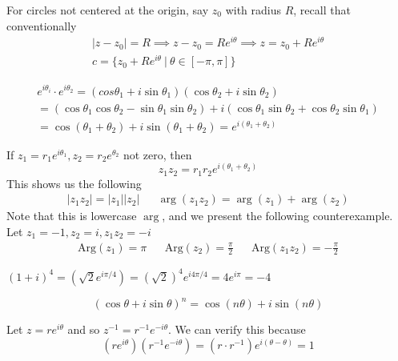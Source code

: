 \documentclass[12pt]{scrartcl}
\begin{document}
\begin{note}
  For circles not centered at the origin, say $z_0$ with radius $R$, recall that conventionally
  \begin{align*}
    |z-z_0| = R \implies z-z_0 = Re^{i\theta} \implies z = z_0 + Re^{i\theta}\\ 
    c = \{z_0 + Re^{i\theta} \ | \ \theta \in [-\pi, \pi]\}
  \end{align*}
\end{note}

\begin{note}
  \begin{align*}
    e^{i\theta_i} \cdot e^{i\theta_2} = (cos\theta_1 + i\sin\theta_1)(\cos\theta_2 + i\sin\theta_2)\\
    = (\cos\theta_1 \cos\theta_2 - \sin\theta_1 \sin\theta_2) + i(\cos\theta_1 \sin\theta_2 + \cos\theta_2\sin\theta_1)\\
     = \cos(\theta_1 + \theta_2) + i\sin(\theta_1 + \theta_2) = e^{i(\theta_1 + \theta_2)}
  \end{align*}
\end{note}

\begin{note}
  If $z_1 = r_1e^{i\theta_1}, z_2 = r_2e^{\theta_2}$ not zero, then 
  \[z_1z_2 = r_1r_2e^{i(\theta_1 + \theta_2)}\]
  This shows us the following 
  \begin{align*}
    |z_1z_2| = |z_1||z_2| && \arg(z_1z_2) = \arg(z_1) + \arg(z_2)
  \end{align*}
  Note that this is lowercase $\arg$, and we present the following counterexample. Let $z_1 = -1, z_2 = i, z_1z_2 = -i$
  \begin{align*}
    \text{Arg}(z_1) = \pi && \text{Arg}(z_2) = \frac{\pi}{2} && \text{Arg}(z_1z_2) = -\frac{\pi}{2}
  \end{align*}
\end{note}

\begin{example}
  $(1 + i)^4 = (\sqrt{2}e^{i\pi/4}) = (\sqrt{2})^4 e^{i4\pi / 4} = 4e^{i\pi} = -4$
\end{example}

\begin{theorem}
  \[(\cos\theta + i\sin\theta)^n = \cos(n\theta) + i\sin(n\theta)\]
\end{theorem}

\begin{definition}
  Let $z = re^{i\theta}$ and so $z^{-1} = r^{-1}e^{-i\theta}$. We can verify this because 
  \[(re^{i\theta})(r^{-1}e^{-i\theta}) = (r \cdot r^{-1})e^{i(\theta - \theta)} = 1\]
\end{definition}
\end{document}
